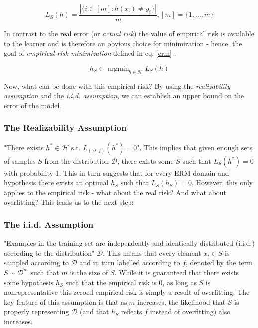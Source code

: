 \documentclass[10pt,conference]{IEEEtran}
\def\dist{\mathcal{D}}
\def\hypspace{\mathcal{H}}
\DeclareMathOperator*{\argmin}{argmin}
\begin{document}
  \begin{equation}
    \label{trainingerror}
    L_S(h) = \frac{|\{i \in [m] : h(x_i) \neq y_i\}|}{m}, [m] = \{1, ..., m\}
  \end{equation}

  In contrast to the real error (or \emph{actual risk}) the value of empirical risk is available to the learner and is therefore an obvious choice for minimization - hence, the goal of \emph{empirical risk minimization} defined in eq. \ref{erm} \cite{shais}.

  \begin{equation}
    \label{erm}
    h_S \in \argmin_{h \in \hypspace} L_S(h)
  \end{equation}

  Now, what can be done with this empirical risk? By using the \emph{realizability assumption} and the \emph{i.i.d. assumption}, we can establish an upper bound on the error of the model.

  \subsubsection{\textbf{The Realizability Assumption}} 
    "There exists $h^* \in \hypspace$ s.t. $L_{(\dist, f)}(h^*) = 0$"\cite{shais}. This implies that given enough sets of samples $S$ from the distribution $\dist$, there exists some $S$ such that $L_S(h^*) = 0$ with probability 1. This in turn suggests that for every ERM domain and hypothesis there exists an optimal $h_S$ such that $L_S(h_S) = 0$. However, this only applies to the empirical risk - what about the real risk? And what about overfitting? This leads us to the next step:
  \subsubsection{\textbf{The i.i.d. Assumption}} 
    "Examples in the training set are independently and identically distributed (i.i.d.) according to the distribution" $\dist$\cite{shais}. This means that every element $x_i \in S$ is sampled according to $\dist$ and in turn labelled according to $f$, denoted by the term $S \sim \dist^m$ such that $m$ is the size of $S$\cite{shais}. While it is guaranteed that there exists some hypothesis $h_S$ such that the empirical risk is 0, as long as $S$ is nonrepresentative this zeroed empirical risk is simply a result of overfitting. The key feature of this assumption is that as $m$ increases, the likelihood that $S$ is properly representing $\dist$ (and that $h_S$ reflects $f$ instead of overfitting) also increases\cite{shais}. 
  
\end{document}
